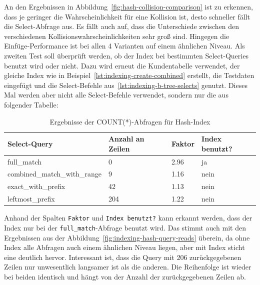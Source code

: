 An den Ergebnissen in Abbildung~\ref{fig:hash-collision-comparison} ist zu erkennen, dass je geringer die Wahrscheinlichkeit für eine Kollision ist, desto schneller fällt die Select-Abfrage aus.
Es fällt auch auf, dass die Unterschiede zwischen den verschiedenen Kollisionswahrscheinlichkeiten sehr groß sind.
Hingegen die Einfüge-Performance ist bei allen 4 Varianten auf einem ähnlichen Niveau.
Als zweiten Test soll überprüft werden, ob der Index bei bestimmten Select-Queries benutzt wird oder nicht.
Dazu wird erneut die Kundentabelle verwendet, der gleiche Index wie in Beispiel~\ref{lst:indexing-create-combined} erstellt, die Testdaten eingefügt und die Select-Befehle aus~\ref{lst:indexing-b-tree-selects} genutzt.
Dieses Mal werden aber nicht alle Select-Befehle verwendet, sondern nur die aus folgender Tabelle:

\vspace{-4pt}
\begin{table}[H]
    \centering
    \scriptsize
    \begin{tabular}{|l|l|l|l|}
        \hline
        \textbf{Select-Query} & \textbf{Anzahl an Zeilen} & \textbf{Faktor} & \textbf{Index benutzt?} \\
        \hline
        full\_match & 0 & 2.96 & ja \\
        combined\_match\_with\_range & 9 & 1.16 & nein \\
        exact\_with\_prefix & 42 & 1.13 & nein \\
        leftmost\_prefix & 204 & 1.22 & nein \\
        \hline
    \end{tabular}
    \vspace{3pt}
    \caption{Ergebnisse der COUNT(*)-Abfragen für Hash-Index}
    \label{tab:indexing_hash_count_results}
\end{table}
\vspace{-30pt}

Anhand der Spalten \texttt{Faktor} und \texttt{Index benutzt?} kann erkannt werden, dass der Index nur bei der \texttt{full\_match}-Abfrage benutzt wird.
Das stimmt auch mit den Ergebnissen aus der Abbildung~\ref{fig:indexing-hash-query-reads} überein, da ohne Index alle Abfragen auch einem ähnlichen Niveau liegen, aber mit Index sticht eine deutlich hervor.
Interessant ist, dass die Query mit 206 zurückgegebenen Zeilen nur unwesentlich langsamer ist als die anderen.
Die Reihenfolge ist wieder bei beiden identisch und hängt von der Anzahl der zurückgegebenen Zeilen ab.


